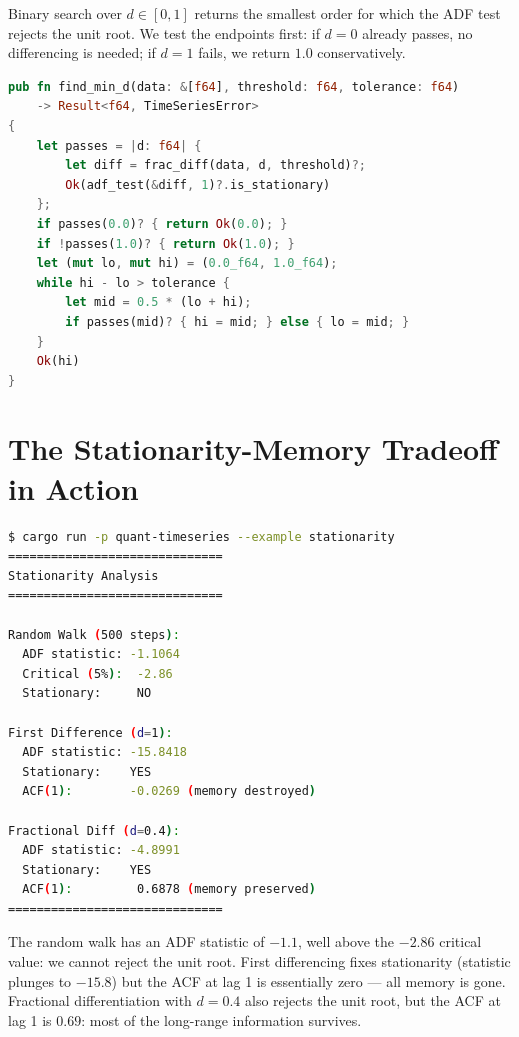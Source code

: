 Binary search over $d \in [0, 1]$ returns the smallest order for which the
ADF test rejects the unit root. We test the endpoints first: if $d = 0$
already passes, no differencing is needed; if $d = 1$ fails, we return $1.0$
conservatively.

\begin{lstlisting}[language=Rust]
pub fn find_min_d(data: &[f64], threshold: f64, tolerance: f64)
    -> Result<f64, TimeSeriesError>
{
    let passes = |d: f64| {
        let diff = frac_diff(data, d, threshold)?;
        Ok(adf_test(&diff, 1)?.is_stationary)
    };
    if passes(0.0)? { return Ok(0.0); }
    if !passes(1.0)? { return Ok(1.0); }
    let (mut lo, mut hi) = (0.0_f64, 1.0_f64);
    while hi - lo > tolerance {
        let mid = 0.5 * (lo + hi);
        if passes(mid)? { hi = mid; } else { lo = mid; }
    }
    Ok(hi)
}
\end{lstlisting}

\section{The Stationarity-Memory Tradeoff in Action}


\begin{lstlisting}[language=bash]
$ cargo run -p quant-timeseries --example stationarity
==============================
Stationarity Analysis
==============================

Random Walk (500 steps):
  ADF statistic: -1.1064
  Critical (5%):  -2.86
  Stationary:     NO

First Difference (d=1):
  ADF statistic: -15.8418
  Stationary:    YES
  ACF(1):        -0.0269 (memory destroyed)

Fractional Diff (d=0.4):
  ADF statistic: -4.8991
  Stationary:    YES
  ACF(1):         0.6878 (memory preserved)
==============================
\end{lstlisting}

The random walk has an ADF statistic of $-1.1$, well above the $-2.86$
critical value: we cannot reject the unit root. First differencing fixes
stationarity (statistic plunges to $-15.8$) but the ACF at lag 1 is
essentially zero --- all memory is gone. Fractional differentiation with
$d = 0.4$ also rejects the unit root, but the ACF at lag 1 is $0.69$:
most of the long-range information survives.

